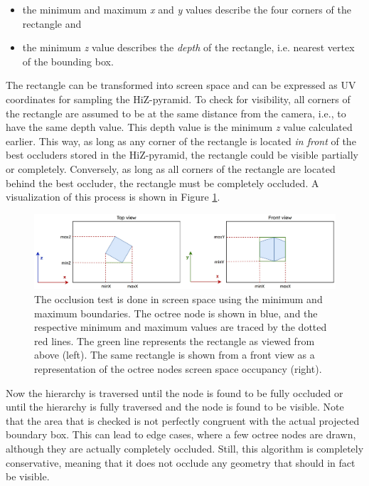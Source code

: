 \begin{itemize}
    \item the minimum and maximum \emph{x} and \emph{y} values describe the four corners of the rectangle and
    \item the minimum \emph{z} value describes the \emph{depth} of the rectangle, i.e. nearest vertex of the bounding box.
\end{itemize}

\noindent
The rectangle can be transformed into screen space and can be expressed as UV coordinates for sampling the 
\ac{HiZ}-pyramid. To check for visibility, all corners of the rectangle are assumed to be at the same distance 
from the camera, i.e., to have the same depth value. This depth value is the minimum \emph{z} value calculated earlier.
This way, as long as any corner of the rectangle is located \emph{in front} of the best occluders stored in the 
\ac{HiZ}-pyramid, the rectangle could be visible partially or completely. Conversely, as long as all corners of 
the rectangle are located behind the best occluder, the rectangle must be completely occluded. A visualization of 
this process is shown in Figure \ref{fig:screen-space-occlusion-test}.

\begin{figure}[h]
    \centering
    \includegraphics[width=\linewidth]{images/graphics/screen_space_occlusion_test.jpg}
    \caption{The occlusion test is done in screen space using the minimum and maximum boundaries. The octree node 
    is shown in blue, and the respective minimum and maximum values are traced by the dotted red lines. The green 
    line represents the rectangle as viewed from above (left). The same rectangle is shown from a front view as a 
    representation of the octree nodes screen space occupancy (right).}
    \label{fig:screen-space-occlusion-test}
\end{figure}

\noindent
Now the hierarchy is traversed until the node is found to be fully occluded or until the hierarchy is fully traversed 
and the node is found to be visible. Note that the area that is checked is not perfectly congruent with the actual 
projected boundary box. This can lead to edge cases, where a few octree nodes are drawn, although they are actually 
completely occluded. Still, this algorithm is completely conservative, meaning that it does not occlude any geometry 
that should in fact be visible.

